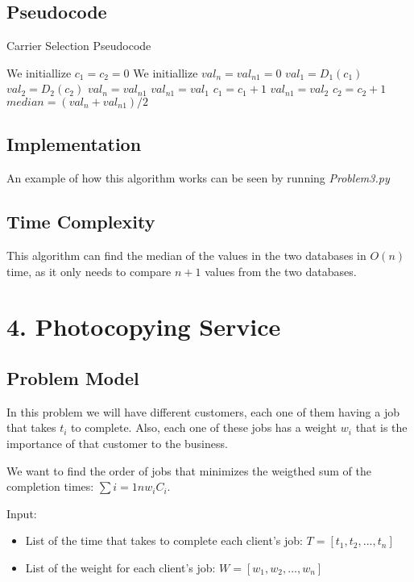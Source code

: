 \documentclass{article}
\begin{document}
\subsection*{Pseudocode}

\begin{algorithm}[H]
\caption{Carrier Selection Pseudocode}
\begin{algorithmic}[1]
\State We initiallize $c_1 = c_2 = 0$
\State We initiallize $val_n = val_{n1} = 0$
 \State $val_1 = D_1(c_1)$
 \State $val_2 = D_2(c_2)$
 \State $val_n = val_{n1}$
  \State $val_{n1} = val_1$
  \State $c_1 = c_1 + 1$
 \Else
  \State $val_{n1} = val_2$
  \State $c_2 = c_2 + 1$
 \EndIf
\EndFor
\State \Return $median = (val_n+val_{n1})/2$
\end{algorithmic}
\end{algorithm}

\subsection*{Implementation}

An example of how this algorithm works can be seen by running \textit{Problem3.py}

\subsection*{Time Complexity}

This algorithm can find the median of the values in the two databases in $O(n)$ time, as it only needs to compare $n+1$ values from the two databases.

\section*{4. Photocopying Service}

\subsection*{Problem Model}

In this problem we will have different customers, each one of them having a job that takes $t_i$ to complete. Also, each one of these jobs has a weight $w_i$ that is the importance of that customer to the business.

We want to find the order of jobs that minimizes the weigthed sum of the completion times: $\sum{i=1}{n}w_i C_i$.

Input:
\begin{itemize}
 \item List of the time that takes to complete each client's job: $T = [t_1,t_2,...,t_n]$
 \item List of the weight for each client's job: $W = [w_1,w_2,...,w_n]$
\end{itemize}
\end{document}
